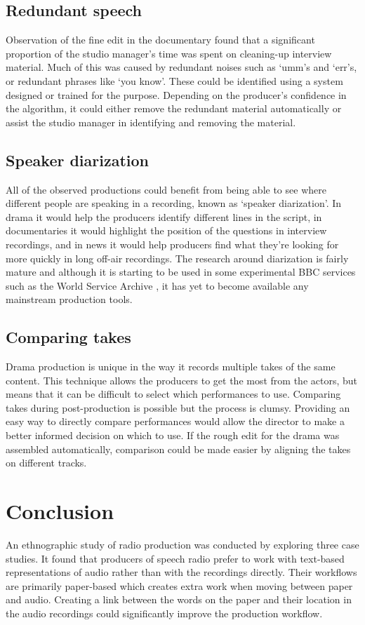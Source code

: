 \subsection{Redundant speech}
Observation of the fine edit in the documentary found that a significant proportion of the studio manager's time was
spent on cleaning-up interview material. Much of this was caused by redundant noises such as `umm's and `err's, or
redundant phrases like `you know'. These could be identified using a system designed or trained for the purpose.
Depending on the producer's confidence in the algorithm, it could either remove the redundant material automatically or
assist the studio manager in identifying and removing the material. 

\subsection{Speaker diarization}
All of the observed productions could benefit from being able to see where different people are speaking in a
recording, known as `speaker diarization'. In drama it would help the producers identify different lines in the script,
in documentaries it would highlight the position of the questions in interview recordings, and in news it would help
producers find what they're looking for more quickly in long off-air recordings. The research around diarization is
fairly mature \citep{AngueraMiro2012} and although it is starting to be used in some experimental BBC services such as
the World Service Archive \citep{Raimond2014}, it has yet to become available any mainstream production tools.

\subsection{Comparing takes}
Drama production is unique in the way it records multiple takes of the same content. This technique allows the
producers to get the most from the actors, but means that it can be difficult to select which performances to use.
Comparing takes during post-production is possible but the process is clumsy.  Providing an easy way to directly
compare performances would allow the director to make a better informed decision on which to use. If the rough edit for
the drama was assembled automatically, comparison could be made easier by aligning the takes on different tracks.

\section{Conclusion}\label{sec:ethno-conclusion}
An ethnographic study of radio production was conducted by exploring three case studies. It found that producers of
speech radio prefer to work with text-based representations of audio rather than with the recordings directly. Their
workflows are primarily paper-based which creates extra work when moving between paper and audio. Creating a link
between the words on the paper and their location in the audio recordings could significantly improve the production
workflow.

